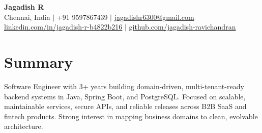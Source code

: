 \documentclass[a4paper,10pt]{article}
\begin{document}
\begin{center}
    {\LARGE\bfseries\color{primary} Jagadish R}\\[4pt]
    {\small
    Chennai, India \quad$\vert$\quad
    +91 9597867439 \quad$\vert$\quad
    \href{mailto:jagadishr6300@gmail.com}{jagadishr6300@gmail.com}\\[3pt]
    \href{https://www.linkedin.com/in/jagadish-r-b4822b216}{linkedin.com/in/jagadish-r-b4822b216} \quad$\vert$\quad
    \href{https://github.com/jagadish-ravichandran}{github.com/jagadish-ravichandran}
    }
\end{center}
\section*{Summary}
\vspace{6pt}
\noindent Software Engineer with 3+ years building domain-driven, multi-tenant-ready backend systems in Java, Spring Boot, and PostgreSQL. Focused on scalable, maintainable services, secure APIs, and reliable releases across B2B SaaS and fintech products. Strong interest in mapping business domains to clean, evolvable architecture.
\end{document}
